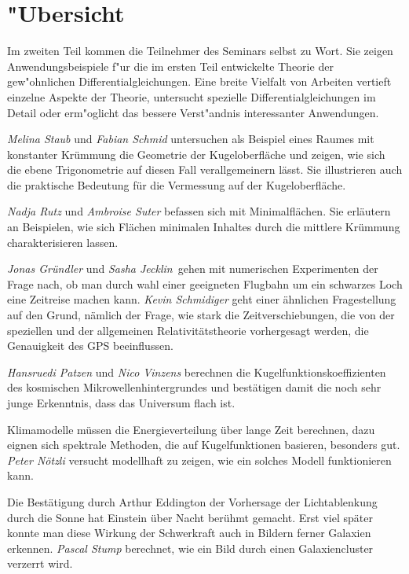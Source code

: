 %
%
%
\chapter*{"Ubersicht}
\rhead{}
\label{skript:uebersicht}
Im zweiten Teil kommen die Teilnehmer des Seminars selbst zu Wort.
Sie zeigen Anwendungsbeispiele f"ur die im ersten
Teil entwickelte Theorie der gew"ohnlichen Differentialgleichungen.
Eine breite Vielfalt von Arbeiten vertieft einzelne Aspekte der Theorie,
untersucht spezielle Differentialgleichungen im Detail
oder erm"oglicht das bessere Verst"andnis interessanter Anwendungen.

{\em Melina Staub} und {\em Fabian Schmid} untersuchen als Beispiel
eines Raumes mit konstanter Krümmung die Geometrie der Kugeloberfläche
und zeigen, wie sich die ebene Trigonometrie auf diesen Fall verallgemeinern
lässt.
Sie illustrieren auch die praktische Bedeutung für die Vermessung auf
der Kugeloberfläche.

{\em Nadja Rutz} und {\em Ambroise Suter} befassen sich mit Minimalflächen.
Sie erläutern an Beispielen, wie sich Flächen minimalen Inhaltes durch
die mittlere Krümmung charakterisieren lassen.

{\em Jonas Gründler} und {\em Sasha Jecklin} gehen mit numerischen
Experimenten der Frage nach, ob man durch wahl einer geeigneten
Flugbahn um ein schwarzes Loch eine Zeitreise machen kann.
{\em Kevin Schmidiger} geht einer ähnlichen Fragestellung auf den Grund,
nämlich der Frage, wie stark die Zeitverschiebungen, die von der
speziellen und der allgemeinen Relativitätstheorie vorhergesagt werden,
die Genauigkeit des GPS beeinflussen.

{\em Hansruedi Patzen} und {\em Nico Vinzens} berechnen
die Kugelfunktionskoeffizienten des kosmischen Mikrowellenhintergrundes
und bestätigen damit die noch sehr junge Erkenntnis, dass das
Universum flach ist.

Klimamodelle müssen die Energieverteilung über lange Zeit berechnen,
dazu eignen sich spektrale Methoden, die auf Kugelfunktionen basieren,
besonders gut. {\em Peter Nötzli} versucht modellhaft zu zeigen, wie
ein solches Modell funktionieren kann.

Die Bestätigung durch Arthur Eddington der Vorhersage der Lichtablenkung
durch die Sonne hat Einstein über Nacht berühmt gemacht.
Erst viel später konnte man diese Wirkung der Schwerkraft auch in
Bildern ferner Galaxien erkennen.
{\em Pascal Stump} berechnet, wie ein Bild durch einen Galaxiencluster
verzerrt wird.

